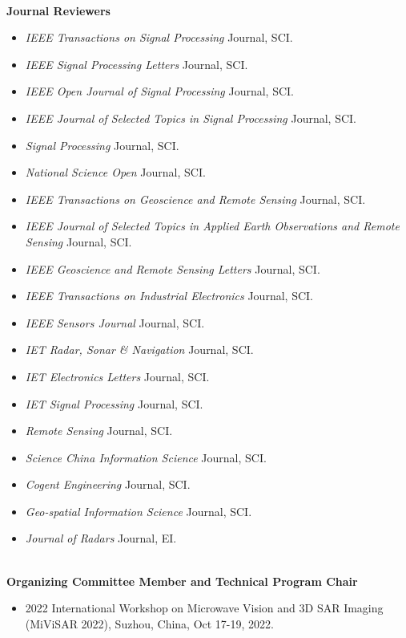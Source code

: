 \documentclass[paper=a4,fontsize=11pt]{scrartcl}
\begin{document}
~\\

\textbf{Journal Reviewers} 
\begin{itemize}
	\item \textit{IEEE Transactions on Signal Processing} Journal, SCI.
	\item \textit{IEEE Signal Processing Letters} Journal, SCI.
	\item \textit{IEEE Open Journal of Signal Processing} Journal, SCI.
	\item \textit{IEEE Journal of Selected Topics in Signal Processing} Journal, SCI.
	\item \textit{Signal Processing} Journal, SCI.
	\item \textit{National Science Open} Journal, SCI.
	\item \textit{IEEE Transactions on Geoscience and Remote Sensing} Journal, SCI.
	\item \textit{IEEE Journal of Selected Topics in Applied Earth Observations and Remote Sensing} Journal, SCI.
	\item \textit{IEEE Geoscience and Remote Sensing Letters} Journal, SCI.
	\item \textit{IEEE Transactions on Industrial Electronics} Journal, SCI.
	\item \textit{IEEE Sensors Journal} Journal, SCI.
	\item \textit{IET Radar, Sonar \& Navigation} Journal, SCI.
	\item \textit{IET Electronics Letters} Journal, SCI.
	\item \textit{IET Signal Processing} Journal, SCI.
	\item \textit{Remote Sensing} Journal, SCI.
	\item \textit{Science China Information Science} Journal, SCI.
	\item \textit{Cogent Engineering} Journal, SCI.
	\item \textit{Geo-spatial Information Science} Journal, SCI.
	\item \textit{Journal of Radars} Journal, EI.
\end{itemize}
~\\
\textbf{Organizing Committee Member and Technical Program Chair} 
\begin{itemize}
	\item 2022 International Workshop on Microwave Vision and 3D SAR Imaging (MiViSAR 2022), Suzhou, China, Oct 17-19, 2022.
\end{itemize}
~\\
\end{document}
